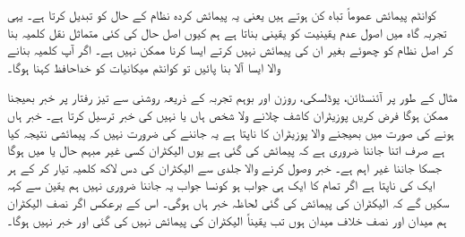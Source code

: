 کوانٹم پیمائش عموماً تباہ کن ہوتے ہیں یعنی یہ پیمائش کردہ نظام کے حال کو تبدیل کرتا ہے۔ یہی تجربہ گاہ میں اصول عدم یقینیت کو یقینی بناتا ہے ہم کیوں اصل حال کی کئی متماثل نقل کلمیہ بنا کر اصل نظام کو چھوئے بغیر ان کی پیمائش نہیں کرتے ایسا کرنا ممکن نہیں ہے۔ اگر آپ کلمیہ بنانے والا ایسا آلا بنا پائیں تو کوانٹم میکانیات کو خداحافظ کہنا ہوگا۔

مثال کے طور پر آئنسٹائن، پوڈلسکی، روزن اور بوہم تجربہ کے ذریعہ روشنی سے تیز رفتار پر خبر بھیجنا ممکن ہوگا فرض کریں پوزیٹران کاشف چلانے ولا شخص ہاں یا نہیں کی خبر ترسیل کرتا ہے۔ خبر ہاں ہونے کی صورت میں بھیجنے والا پوزیٹران کا  ناپتا ہے یہ جاننے کی ضرورت نہیں کہ پیمائشی نتیجہ کیا ہے صرف اتنا جاننا ضروری ہے کہ پیمائش کی گئی ہے یوں الیکٹران کسی غیر مبہم حال  یا  میں ہوگا جسکا جاننا غیر اہم ہے۔ خبر وصول کرنے والا جلدی سے الیکٹران کی دس لاکھ کلمیہ تیار کر کے ہر ایک کی  ناپتا ہے اگر تمام کا ایک ہی جواب ہو کونسا جواب یہ جاننا ضروری نہیں ہم یقین سے کہہ سکیں گے کہ الیکٹران کی پیمائش کی گئی لحاظہ خبر ہاں ہوگی۔ اس کے برعکس اگر نصف الیکٹران ہم میدان اور نصف خلاف میدان ہوں تب یقیناً الیکٹران کی پیمائش نہیں کی گئی اور خبر نہیں ہوگا۔

